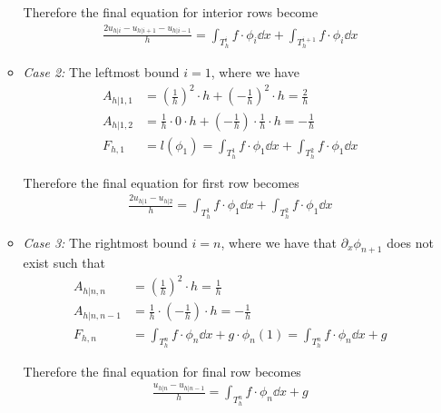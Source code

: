 \begin{enumerate}[label=(\alph*),leftmargin=*,itemsep=0mm]
\begin{itemize}
        Therefore the final equation for interior rows become
        \begin{align}
            \frac{2u_{h|i}-u_{h|i+1}-u_{h|i-1}}{h}
            = \int_{T_h^i} f\cdot\phi_i \dd{x} + \int_{T_h^{i+1}} f\cdot\phi_i \dd{x}
        \end{align}
        
        \item \textit{Case 2:} The leftmost bound $i=1$, where we have
        \begin{align*}
            A_{h|1,1} &= \left(\frac{1}{h}\right)^2 \cdot h
            + \left(-\frac{1}{h}\right)^2 \cdot h
            = \frac{2}{h}\\
            A_{h|1,2} &= \frac{1}{h} \cdot 0 \cdot h
            + \left(-\frac{1}{h}\right) \cdot \frac{1}{h} \cdot h
            = -\frac{1}{h} \\
            F_{h,1} &= l(\phi_1) = \int_{T_h^1} f\cdot\phi_1 \dd{x} + \int_{T_h^2} f\cdot\phi_1 \dd{x}
        \end{align*}
        
        Therefore the final equation for first row becomes
        \begin{align}
            \frac{2u_{h|1}-u_{h|2}}{h}
            = \int_{T_h^1} f\cdot\phi_1 \dd{x} + \int_{T_h^2} f\cdot\phi_1 \dd{x}
        \end{align}
        
        \item \textit{Case 3:} The rightmost bound $i=n$, where we have that $\partial_x\phi_{n+1}$ does not exist such that
        \begin{align*}
            A_{h|n,n} &= \left(\frac{1}{h}\right)^2 \cdot h = \frac{1}{h}\\
            A_{h|n,n-1} &= \frac{1}{h} \cdot \left(-\frac{1}{h}\right) \cdot h = -\frac{1}{h}\\
            F_{h,n} &= \int_{T_h^n} f\cdot\phi_n \dd{x} + g\cdot \phi_n(1)
            = \int_{T_h^n} f\cdot\phi_n \dd{x} + g
        \end{align*}
        
        Therefore the final equation for final row becomes
        \begin{align}
            \frac{u_{h|n}-u_{h|n-1}}{h}
            = \int_{T_h^n} f\cdot\phi_n \dd{x} + g
        \end{align}
        
    \end{itemize}
    

\end{enumerate}
